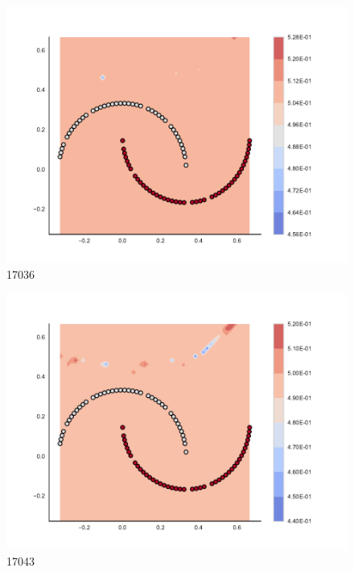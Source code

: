 \begin{subfigure}[b]{0.09\textwidth}
    \includegraphics[clip, trim=2.35cm 1.75cm 4.5cm 0cm,width=\textwidth]{img/convergence/17036.pdf}
    \caption{17036}
    \label{fig:convergence_17036}
\end{subfigure}
%
\begin{subfigure}[b]{0.09\textwidth}
    \includegraphics[clip, trim=2.35cm 1.75cm 4.5cm 0cm,width=\textwidth]{img/convergence/17043.pdf}
    \caption{17043}
    \label{fig:convergence_17043}
\end{subfigure}
%
